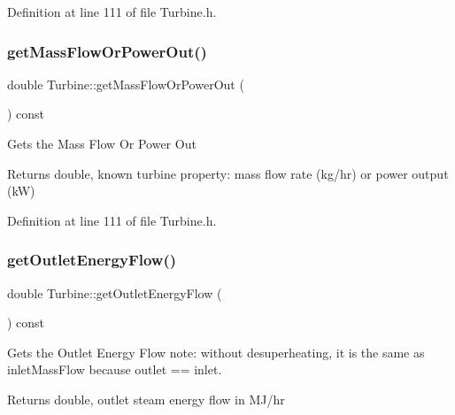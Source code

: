 Definition at line 111 of file Turbine.\+h.

\mbox{\label{class_turbine_a820a090d264b96ee84f717555545c287}} 
\subsubsection{\texorpdfstring{get\+Mass\+Flow\+Or\+Power\+Out()}{getMassFlowOrPowerOut()}\hspace{0.1cm}{\footnotesize\ttfamily [3/3]}}
{\footnotesize\ttfamily double Turbine\+::get\+Mass\+Flow\+Or\+Power\+Out (\begin{DoxyParamCaption}{ }\end{DoxyParamCaption}) const\hspace{0.3cm}{\ttfamily [inline]}}

Gets the Mass Flow Or Power Out

\begin{DoxyReturn}{Returns}
double, known turbine property\+: mass flow rate (kg/hr) or power output (kW) 
\end{DoxyReturn}


Definition at line 111 of file Turbine.\+h.

\mbox{\label{class_turbine_aa20c0f9dd81cd9bfd5eda77f588516b5}} 
\subsubsection{\texorpdfstring{get\+Outlet\+Energy\+Flow()}{getOutletEnergyFlow()}\hspace{0.1cm}{\footnotesize\ttfamily [1/3]}}
{\footnotesize\ttfamily double Turbine\+::get\+Outlet\+Energy\+Flow (\begin{DoxyParamCaption}{ }\end{DoxyParamCaption}) const\hspace{0.3cm}{\ttfamily [inline]}}

Gets the Outlet Energy Flow note\+: without desuperheating, it is the same as inlet\+Mass\+Flow because outlet == inlet. \begin{DoxyReturn}{Returns}
double, outlet steam energy flow in M\+J/hr 
\end{DoxyReturn}


